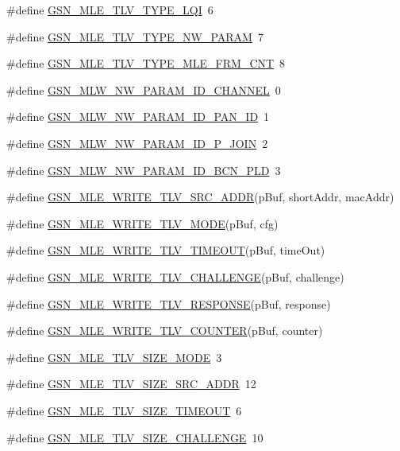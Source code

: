 \begin{DoxyCompactItemize}
\#define \hyperlink{a00527_a8d22cd1a82a36008eea5d5b2e69f845e}{GSN\_\-MLE\_\-TLV\_\-TYPE\_\-LQI}~6
\item 
\#define \hyperlink{a00527_a1b7864a8c86208b30b3ec29d660e9cff}{GSN\_\-MLE\_\-TLV\_\-TYPE\_\-NW\_\-PARAM}~7
\item 
\#define \hyperlink{a00527_a8bc0ba2f61bfaad972d62ee551f839a0}{GSN\_\-MLE\_\-TLV\_\-TYPE\_\-MLE\_\-FRM\_\-CNT}~8
\item 
\#define \hyperlink{a00527_ae65b696d76d0b202bce2451e38f183ed}{GSN\_\-MLW\_\-NW\_\-PARAM\_\-ID\_\-CHANNEL}~0
\item 
\#define \hyperlink{a00527_aecfc12d703e039ff9fefc611122030a2}{GSN\_\-MLW\_\-NW\_\-PARAM\_\-ID\_\-PAN\_\-ID}~1
\item 
\#define \hyperlink{a00527_afd6e248344b7cbbd90817a553acadbb0}{GSN\_\-MLW\_\-NW\_\-PARAM\_\-ID\_\-P\_\-JOIN}~2
\item 
\#define \hyperlink{a00527_ae0dbbcbb5be346aebf25a8c8193ce685}{GSN\_\-MLW\_\-NW\_\-PARAM\_\-ID\_\-BCN\_\-PLD}~3
\item 
\#define \hyperlink{a00527_a999b237c7d75f70680b436c7598b4874}{GSN\_\-MLE\_\-WRITE\_\-TLV\_\-SRC\_\-ADDR}(pBuf, shortAddr, macAddr)
\item 
\#define \hyperlink{a00527_a860bf67835ad1dbc704225c3c3ff454f}{GSN\_\-MLE\_\-WRITE\_\-TLV\_\-MODE}(pBuf, cfg)
\item 
\#define \hyperlink{a00527_ab9ebe409bc701cab2f6626a35ad1a6f8}{GSN\_\-MLE\_\-WRITE\_\-TLV\_\-TIMEOUT}(pBuf, timeOut)
\item 
\#define \hyperlink{a00527_a091ef7329226017ce21765e8c6eea021}{GSN\_\-MLE\_\-WRITE\_\-TLV\_\-CHALLENGE}(pBuf, challenge)
\item 
\#define \hyperlink{a00527_a1729783155d47f0e47c4024cabd14e56}{GSN\_\-MLE\_\-WRITE\_\-TLV\_\-RESPONSE}(pBuf, response)
\item 
\#define \hyperlink{a00527_a84a5f4a8c09e8a12ec7b21d03d8fea03}{GSN\_\-MLE\_\-WRITE\_\-TLV\_\-COUNTER}(pBuf, counter)
\item 
\#define \hyperlink{a00527_a92a27696a98909cc234a479caf893b25}{GSN\_\-MLE\_\-TLV\_\-SIZE\_\-MODE}~3
\item 
\#define \hyperlink{a00527_ab8e74552a1d4b8387b4b4e0d3e50cb72}{GSN\_\-MLE\_\-TLV\_\-SIZE\_\-SRC\_\-ADDR}~12
\item 
\#define \hyperlink{a00527_a68a7e6a566d31e3dcb23ad77aded3426}{GSN\_\-MLE\_\-TLV\_\-SIZE\_\-TIMEOUT}~6
\item 
\#define \hyperlink{a00527_a6f5411146a7b138bc901675418aba601}{GSN\_\-MLE\_\-TLV\_\-SIZE\_\-CHALLENGE}~10

\end{DoxyCompactItemize}
